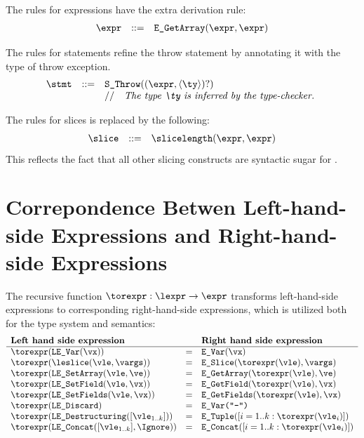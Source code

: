 \documentclass{book}
\begin{document}
The rules for expressions have the extra derivation rule:
\[
\begin{array}{rcl}
\expr &::=& \texttt{E\_GetArray}(\expr, \expr) \\
\end{array}
\]

The rules for statements refine the throw statement by annotating it with
the type of throw exception.
\[
\begin{array}{rcl}
\stmt &::=& \texttt{S\_Throw}((\expr, \langle\ty\rangle)?)\\
      & & \ASTComment{The type $\ty$ is inferred by the type-checker.}
\end{array}
\]

The rules for slices is replaced by the following:
\[
\begin{array}{rcl}
\slice &::=& \slicelength(\expr, \expr) \\
\end{array}
\]
This reflects the fact that all other slicing constructs are syntactic sugar
for \slicelength.

\chapter{Correpondence Betwen Left-hand-side Expressions and Right-hand-side Expressions
\label{ch:LeftToRight}}

The recursive function $\torexpr : \lexpr \rightarrow \expr$ transforms
left-hand-side expressions to corresponding right-hand-side expressions,
which is utilized both for the type system and semantics:
\[
\begin{array}{lcl}
  \textbf{Left hand side expression} & & \textbf{Right hand side expression}\\
  \hline
  \torexpr(\texttt{LE\_Var}(\vx)) &=& \texttt{E\_Var}(\vx)\\
  \torexpr(\leslice(\vle, \vargs)) &=& \texttt{E\_Slice}(\torexpr(\vle), \vargs)\\
  \torexpr(\texttt{LE\_SetArray}(\vle, \ve)) &=& \texttt{E\_GetArray}(\torexpr(\vle), \ve)\\
  \torexpr(\texttt{LE\_SetField}(\vle, \vx)) &=& \texttt{E\_GetField}(\torexpr(\vle), \vx)\\
  \torexpr(\texttt{LE\_SetFields}(\vle, \vx)) &=& \texttt{E\_GetFields}(\torexpr(\vle), \vx)\\
  \torexpr(\texttt{LE\_Discard}) &=& \texttt{E\_Var("-")}\\
  \torexpr(\texttt{LE\_Destructuring}([\vle_{1..k}])) &=& \texttt{E\_Tuple}([i=1..k: \torexpr(\vle_i)])\\
  \torexpr(\texttt{LE\_Concat}([\vle_{1..k}], \Ignore)) &=& \texttt{E\_Concat}([i=1..k: \torexpr(\vle_i)])\\
\end{array}
\]
\end{document}
